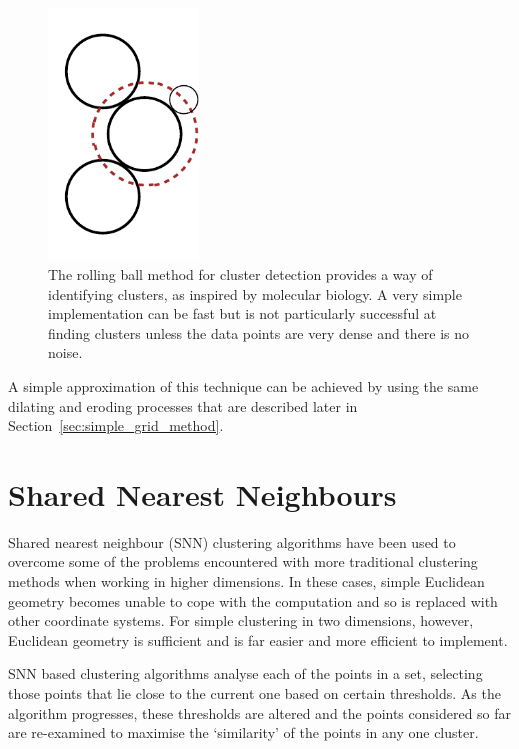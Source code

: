 \begin{figure}[tbh]
	\centering
	\includegraphics[width=4.0cm]{rolling-ball.pdf}

	\caption[Rolling ball method for cluster analysis.]{The rolling ball method
		for cluster detection provides a way of identifying clusters, as
		inspired by molecular biology. A very simple implementation can be fast
		but is not particularly successful at finding clusters unless the data
		points are very dense and there is no noise.}\label{fig:rolling-ball}
\end{figure}

A simple approximation of this technique can be achieved by using the same
dilating and eroding processes that are described later in
Section~\ref{sec:simple_grid_method}.

\section{Shared Nearest Neighbours}
\label{sub:shared_nearest_neighbours}

Shared nearest neighbour (SNN) clustering algorithms have been used to overcome
some of the problems encountered with more traditional clustering methods when
working in higher dimensions. In these cases, simple Euclidean geometry becomes
unable to cope with the computation and so is replaced with other coordinate
systems. For simple clustering in two dimensions, however, Euclidean geometry
is sufficient and is far easier and more efficient to implement.

SNN based clustering algorithms analyse each of the points in a set, selecting
those points that lie close to the current one based on certain thresholds. As
the algorithm progresses, these thresholds are altered and the points
considered so far are re-examined to maximise the `similarity' of the points
in any one cluster.

